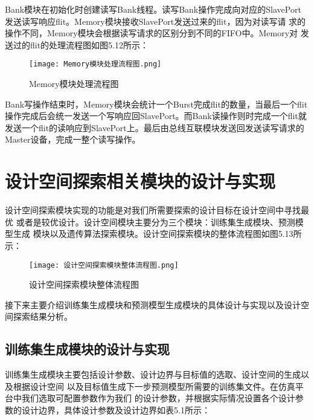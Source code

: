 Bank模块在初始化时创建读写Bank线程。读写Bank操作完成向对应的SlavePort
发送读写响应flit。Memory模块接收SlavePort发送过来的flit，因为对读写请
求的操作不同，Memory模块会根据读写请求的区别分到不同的FIFO中。Memory对
发送过的flit的处理流程图如图5.12所示：

\begin{figure}
    \centering
    \texttt{[image: Memory模块处理流程图.png]}
    \caption{Memory模块处理流程图}
    \label{fig:badge}
\end{figure}

Bank写操作结束时，Memory模块会统计一个Burst完成flit的数量，当最后一个flit
操作完成后会统一发送一个写响应回SlavePort。而Bank读操作则时完成一个flit就
发送一个flit的读响应到SlavePort上。最后由总线互联模块发送回发送读写请求的
Master设备，完成一整个读写操作。

\section{设计空间探索相关模块的设计与实现}

设计空间探索模块实现的功能是对我们所需要探索的设计目标在设计空间中寻找最优
或者是较优设计。设计空间模块主要分为三个模块：训练集生成模块、预测模型生成
模块以及遗传算法探索模块。设计空间探索模块的整体流程图如图5.13所示：

\begin{figure}
    \centering
    \texttt{[image: 设计空间探索模块整体流程图.png]}
    \caption{设计空间探索模块整体流程图}
    \label{fig:badge}
\end{figure}

接下来主要介绍训练集生成模块和预测模型生成模块的具体设计与实现以及设计空间探索结果分析。

\subsection{训练集生成模块的设计与实现}

训练集生成模块主要包括设计参数、设计边界与目标值的选取、设计空间的生成以及根据设计空间
以及目标值生成下一步预测模型所需要的训练集文件。在仿真平台中我们选取可配置参数作为我们
的设计参数，并根据实际情况设置各个设计参数的设计边界，具体设计参数及设计边界如表5.1所示：

